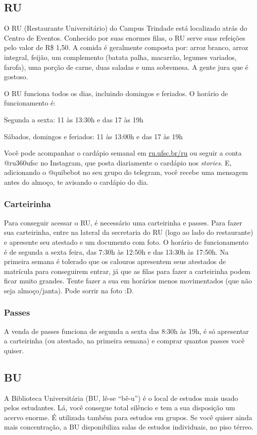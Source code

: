 \documentclass{article}
\begin{document}
\subsection{RU}
O RU (Restaurante Universitário) do Campus Trindade está localizado atrás do Centro de Eventos. Conhecido por suas enormes filas, o RU serve suas refeições pelo valor de R\$ 1,50. A comida é geralmente composta por: arroz branco, arroz integral, feijão, um complemento (batata palha, macarrão, legumes variados, farofa), uma porção de carne, duas saladas e uma sobremesa. A gente jura que é gostoso. 

O RU funciona todos os dias, incluindo domingos e feriados. O horário de funcionamento é:


Segunda a sexta: 11 às 13:30h e das 17 às 19h

Sábados, domingos e feriados: 11 às 13:00h e das 17 às 19h



Você pode acompanhar o cardápio semanal em \url{ru.ufsc.br/ru} ou seguir a conta @ru360ufsc no Instagram, que posta diariamente o cardápio nos \textit{stories}. E, adicionando o @quibebot no seu grupo do telegram, você recebe uma mensagem antes do almoço, te avisando o cardápio do dia.

\subsubsection{Carteirinha} Para conseguir acessar o RU, é necessário uma carteirinha e passes. Para fazer sua carteirinha, entre na lateral da secretaria do RU (logo ao lado do restaurante) e apresente seu atestado e um documento com foto. O horário de funcionamento é de segunda a sexta feira, das 7:30h às 12:50h e das 13:30h às 17:50h. Na primeira semana é tolerado que os calouros apresentem seus atestados de matrícula para conseguirem entrar, já que as filas para fazer a carteirinha podem ficar muito grandes. Tente fazer a sua em horários menos movimentados (que não seja almoço/janta). Pode sorrir na foto :D. 
\subsubsection{Passes} 
A venda de passes funciona de segunda a sexta das 8:30h às 19h, é só apresentar a carteirinha (ou atestado, na primeira semana) e comprar quantos passes você quiser.

\subsection{BU}
A Biblioteca Universitária (BU, lê-se “bê-u”) é o local de estudos mais usado pelos estudantes. Lá, você consegue total silêncio e tem a sua disposição um acervo enorme. É utilizada também para estudos em grupos. Se você quiser ainda mais concentração, a BU disponibiliza salas de estudos individuais, no piso térreo.
\end{document}
